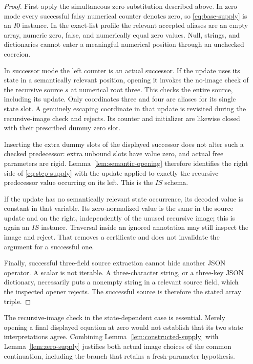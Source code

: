 \documentclass[11pt,letterpaper]{article}
\theoremstyle{definition}
\theoremstyle{remark}
\begin{document}
\begin{proof}
First apply the simultaneous zero substitution described above.  In
zero mode every successful falsy numerical counter denotes zero, so
\eqref{eq:base-supply} is an $I0$ instance.  In the exact-list profile
the relevant accepted aliases are an empty array, numeric zero, false,
and numerically equal zero values.  Null, strings, and dictionaries
cannot enter a meaningful numerical position through an unchecked
coercion.

In successor mode the left counter is an actual successor.  If the
update uses its state in a semantically relevant position, opening it
invokes the no-image check of the recursive source $s$ at numerical
root three.  This checks the entire source, including its update.
Only coordinates three and four are aliases for its single state slot.
A genuinely escaping coordinate in that update is revisited during
the recursive-image check and rejects.  Its counter and initializer
are likewise closed with their prescribed dummy zero slot.

Inserting the extra dummy slots of the displayed successor does not
alter such a checked predecessor: extra unbound slots have value zero,
and actual free parameters are rigid.  Lemma~\ref{lem:semantic-opening}
therefore identifies the right side of \eqref{eq:step-supply} with the
update applied to exactly the recursive predecessor value occurring
on its left.  This is the $IS$ schema.

If the update has no semantically relevant state occurrence, its
decoded value is constant in that variable.  Its zero-normalized value
is the same in the source update and on the right, independently of
the unused recursive image; this is again an $IS$ instance.  Traversal
inside an ignored annotation may still inspect the image and reject.
That removes a certificate and does not invalidate the argument for a
successful one.

Finally, successful three-field source extraction cannot hide another
JSON operator.  A scalar is not iterable.  A three-character string,
or a three-key JSON dictionary, necessarily puts a nonempty string in
a relevant source field, which the inspected opener rejects.  The
successful source is therefore the stated array triple.
\end{proof}

The recursive-image check in the state-dependent case is essential.
Merely opening a final displayed equation at zero would not establish
that its two state interpretations agree.  Combining
Lemma~\ref{lem:constructed-supply} with Lemma~\ref{lem:zero-supply}
justifies both actual image choices of the common continuation, including
the branch that retains a fresh-parameter hypothesis.
\end{document}
